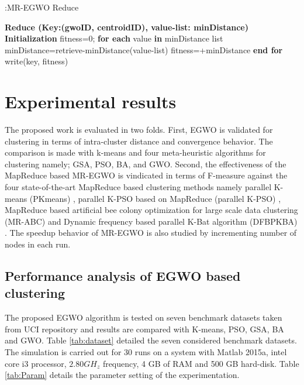 \documentclass[review]{elsarticle}
\begin{document}
\begin{algorithm}
\caption{ :MR-EGWO Reduce}
\small
\label{algo:Reduce}
\begin{algorithmic}  
\STATE \textbf{Reduce (Key:(gwoID, centroidID), value-list: minDistance)} 
\STATE  \textbf{Initialization} 
\STATE   fitness=0;
\STATE	\textbf{for each} value \textbf{in} minDistance list
\STATE	 minDistance=retrieve-minDistance(value-list)       
\STATE   fitness=+minDistance
\STATE   \textbf{end for}
\STATE    write(key, fitness)
\end{algorithmic}
\end{algorithm}

\section{Experimental results }\label{sec:ep}
The proposed work is evaluated in two folds. First, EGWO is validated for clustering in terms of intra-cluster distance and convergence behavior. The comparison is made with k-means and four meta-heuristic algorithms for clustering namely; GSA, PSO, BA, and GWO. Second, the effectiveness of the MapReduce based MR-EGWO is vindicated in terms of F-measure against the four state-of-the-art MapReduce based clustering methods namely parallel K-means (PKmeans) \cite{zhao2009parallel}, parallel K-PSO based on MapReduce (parallel K-PSO) \cite{wang2012parallel}, MapReduce based artificial bee colony optimization for large scale data clustering (MR-ABC) \cite{banharnsakun2016mapreduce} and Dynamic frequency based parallel K-Bat algorithm (DFBPKBA) \cite{tripathidynamic}. The speedup behavior of MR-EGWO is also studied by incrementing number of nodes in each run.  

\subsection{Performance analysis of EGWO based clustering}\label{sec:expr1}
The proposed EGWO algorithm is tested on seven benchmark datasets taken from UCI repository \cite{blake1998uci} and results are compared with K-means, PSO, GSA, BA and GWO. Table \ref{tab:dataset} detailed the seven considered benchmark datasets. The simulation is carried out for 30 runs on a system with Matlab 2015a, intel core i3 processor, $2.80 GH_z$ frequency, 4 GB of RAM and 500 GB hard-disk. Table \ref{tab:Param} details the parameter setting of the experimentation.  
\end{document}
